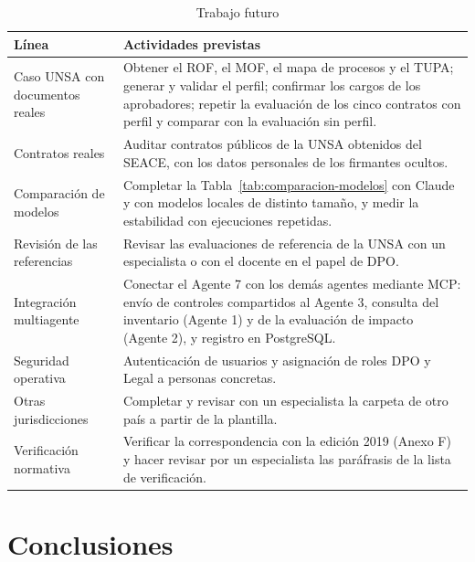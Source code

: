 \documentclass[12pt,letterpaper]{article}
\begin{document}
\begin{table}[H]
\centering
\small
\caption{Trabajo futuro}
\label{tab:futuro}
\begin{tabularx}{\linewidth}{@{}L{3.6cm} Y@{}}
\toprule
\textbf{Línea} & \textbf{Actividades previstas} \\
\midrule
Caso UNSA con documentos reales & Obtener el ROF, el MOF, el mapa de procesos y el TUPA; generar y validar el perfil; confirmar los cargos de los aprobadores; repetir la evaluación de los cinco contratos con perfil y comparar con la evaluación sin perfil. \\
Contratos reales & Auditar contratos públicos de la UNSA obtenidos del SEACE, con los datos personales de los firmantes ocultos. \\
Comparación de modelos & Completar la Tabla~\ref{tab:comparacion-modelos} con Claude y con modelos locales de distinto tamaño, y medir la estabilidad con ejecuciones repetidas. \\
Revisión de las referencias & Revisar las evaluaciones de referencia de la UNSA con un especialista o con el docente en el papel de DPO. \\
Integración multiagente & Conectar el Agente 7 con los demás agentes mediante MCP: envío de controles compartidos al Agente 3, consulta del inventario (Agente 1) y de la evaluación de impacto (Agente 2), y registro en PostgreSQL. \\
Seguridad operativa & Autenticación de usuarios y asignación de roles DPO y Legal a personas concretas. \\
Otras jurisdicciones & Completar y revisar con un especialista la carpeta de otro país a partir de la plantilla. \\
Verificación normativa & Verificar la correspondencia con la edición 2019 (Anexo F) y hacer revisar por un especialista las paráfrasis de la lista de verificación. \\
\bottomrule
\end{tabularx}
\end{table}

\newpage
\section{Conclusiones}
\end{document}
